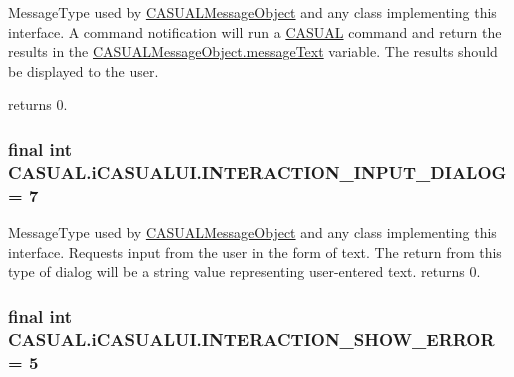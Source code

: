 Message\-Type used by \hyperlink{class_c_a_s_u_a_l_1_1_c_a_s_u_a_l_message_object}{C\-A\-S\-U\-A\-L\-Message\-Object} and any class implementing this interface. A command notification will run a \hyperlink{namespace_c_a_s_u_a_l}{C\-A\-S\-U\-A\-L} command and return the results in the \hyperlink{class_c_a_s_u_a_l_1_1_c_a_s_u_a_l_message_object_a39eaae2b27f09933cfeb9089499fede6}{C\-A\-S\-U\-A\-L\-Message\-Object.\-message\-Text} variable. The results should be displayed to the user.

returns 0. \hypertarget{interface_c_a_s_u_a_l_1_1i_c_a_s_u_a_l_u_i_a1f982ad877027f12d594a1e8fcf942f2}{
\subsubsection[{I\-N\-T\-E\-R\-A\-C\-T\-I\-O\-N\-\_\-\-I\-N\-P\-U\-T\-\_\-\-D\-I\-A\-L\-O\-G}]{\setlength{\rightskip}{0pt plus 5cm}final int C\-A\-S\-U\-A\-L.\-i\-C\-A\-S\-U\-A\-L\-U\-I.\-I\-N\-T\-E\-R\-A\-C\-T\-I\-O\-N\-\_\-\-I\-N\-P\-U\-T\-\_\-\-D\-I\-A\-L\-O\-G = 7}}\label{interface_c_a_s_u_a_l_1_1i_c_a_s_u_a_l_u_i_a1f982ad877027f12d594a1e8fcf942f2}
Message\-Type used by \hyperlink{class_c_a_s_u_a_l_1_1_c_a_s_u_a_l_message_object}{C\-A\-S\-U\-A\-L\-Message\-Object} and any class implementing this interface. Requests input from the user in the form of text. The return from this type of dialog will be a string value representing user-\/entered text. returns 0. \hypertarget{interface_c_a_s_u_a_l_1_1i_c_a_s_u_a_l_u_i_a085238e30ca63987d64acbb37e76a80f}{
\subsubsection[{I\-N\-T\-E\-R\-A\-C\-T\-I\-O\-N\-\_\-\-S\-H\-O\-W\-\_\-\-E\-R\-R\-O\-R}]{\setlength{\rightskip}{0pt plus 5cm}final int C\-A\-S\-U\-A\-L.\-i\-C\-A\-S\-U\-A\-L\-U\-I.\-I\-N\-T\-E\-R\-A\-C\-T\-I\-O\-N\-\_\-\-S\-H\-O\-W\-\_\-\-E\-R\-R\-O\-R = 5}}\label{interface_c_a_s_u_a_l_1_1i_c_a_s_u_a_l_u_i_a085238e30ca63987d64acbb37e76a80f}
